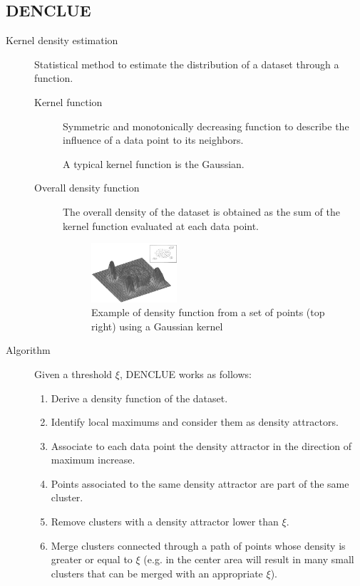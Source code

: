 \subsection{DENCLUE}

\begin{description}
    \item[Kernel density estimation] 
        Statistical method to estimate the distribution of a dataset through a function.

        \begin{description}
            \item[Kernel function] 
                Symmetric and monotonically decreasing function to describe the influence of a data point to its neighbors.

                A typical kernel function is the Gaussian.

            \item[Overall density function]
                The overall density of the dataset is obtained as the sum of the kernel function evaluated at each data point.

                \begin{figure}[H]
                    \centering
                    \includegraphics[width=0.35\textwidth]{img/kernel_density_estimation.png}
                    \caption{Example of density function from a set of points (top right) using a Gaussian kernel}
                    \label{img:denclue}
                \end{figure}
        \end{description}

    \item[Algorithm] 
        Given a threshold $\xi$, DENCLUE works as follows:
        \begin{enumerate}
            \item Derive a density function of the dataset.
            \item Identify local maximums and consider them as density attractors.
            \item Associate to each data point the density attractor in the direction of maximum increase.
            \item Points associated to the same density attractor are part of the same cluster.
            \item Remove clusters with a density attractor lower than $\xi$.
            \item Merge clusters connected through a path of points whose density is greater or equal to $\xi$ 
                (e.g. in  the center area will result in many small clusters that can be merged with an appropriate $\xi$).
        \end{enumerate}


\end{description}
